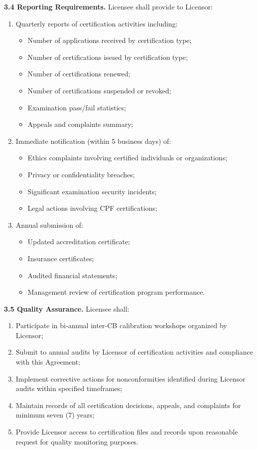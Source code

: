 \documentclass[11pt,a4paper]{article}
\begin{document}
\textbf{3.4 Reporting Requirements.} Licensee shall provide to Licensor:

\begin{enumerate}[label=\alph*)]
\item Quarterly reports of certification activities including:
\begin{itemize}
\item Number of applications received by certification type;
\item Number of certifications issued by certification type;
\item Number of certifications renewed;
\item Number of certifications suspended or revoked;
\item Examination pass/fail statistics;
\item Appeals and complaints summary;
\end{itemize}
\item Immediate notification (within 5 business days) of:
\begin{itemize}
\item Ethics complaints involving certified individuals or organizations;
\item Privacy or confidentiality breaches;
\item Significant examination security incidents;
\item Legal actions involving CPF certifications;
\end{itemize}
\item Annual submission of:
\begin{itemize}
\item Updated accreditation certificate;
\item Insurance certificates;
\item Audited financial statements;
\item Management review of certification program performance.
\end{itemize}
\end{enumerate}

\textbf{3.5 Quality Assurance.} Licensee shall:

\begin{enumerate}[label=\alph*)]
\item Participate in bi-annual inter-CB calibration workshops organized by Licensor;
\item Submit to annual audits by Licensor of certification activities and compliance with this Agreement;
\item Implement corrective actions for nonconformities identified during Licensor audits within specified timeframes;
\item Maintain records of all certification decisions, appeals, and complaints for minimum seven (7) years;
\item Provide Licensor access to certification files and records upon reasonable request for quality monitoring purposes.
\end{enumerate}
\end{document}
